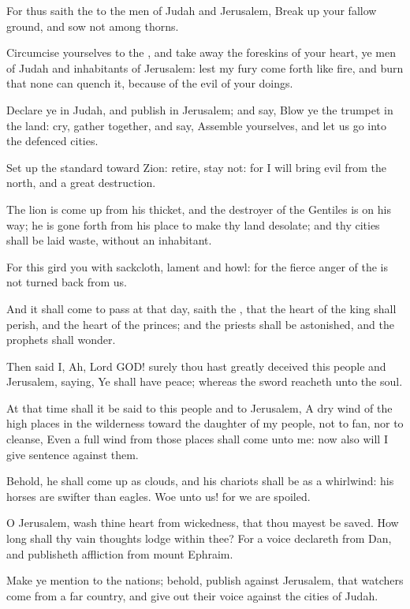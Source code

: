 \Verse For thus saith the \LORD to the men of Judah and Jerusalem, Break up your fallow ground, and sow not among thorns.

\Verse Circumcise yourselves to the \LORD, and take away the foreskins of your heart, ye men of Judah and inhabitants of Jerusalem: lest my fury come forth like fire, and burn that none can quench it, because of the evil of your doings.

\Verse Declare ye in Judah, and publish in Jerusalem; and say, Blow ye the trumpet in the land: cry, gather together, and say, Assemble yourselves, and let us go into the defenced cities.

\Verse Set up the standard toward Zion: retire, stay not: for I will bring evil from the north, and a great destruction.

\Verse The lion is come up from his thicket, and the destroyer of the Gentiles is on his way; he is gone forth from his place to make thy land desolate; and thy cities shall be laid waste, without an inhabitant.

\Verse For this gird you with sackcloth, lament and howl: for the fierce anger of the \LORD is not turned back from us.

\Verse And it shall come to pass at that day, saith the \LORD, that the heart of the king shall perish, and the heart of the princes; and the priests shall be astonished, and the prophets shall wonder.

\Verse Then said I, Ah, Lord GOD! surely thou hast greatly deceived this people and Jerusalem, saying, Ye shall have peace; whereas the sword reacheth unto the soul.

\Verse At that time shall it be said to this people and to Jerusalem, A dry wind of the high places in the wilderness toward the daughter of my people, not to fan, nor to cleanse, \Verse Even a full wind from those places shall come unto me: now also will I give sentence against them.

\Verse Behold, he shall come up as clouds, and his chariots shall be as a whirlwind: his horses are swifter than eagles. Woe unto us! for we are spoiled.

\Verse O Jerusalem, wash thine heart from wickedness, that thou mayest be saved. How long shall thy vain thoughts lodge within thee?  \Verse For a voice declareth from Dan, and publisheth affliction from mount Ephraim.

\Verse Make ye mention to the nations; behold, publish against Jerusalem, that watchers come from a far country, and give out their voice against the cities of Judah.


